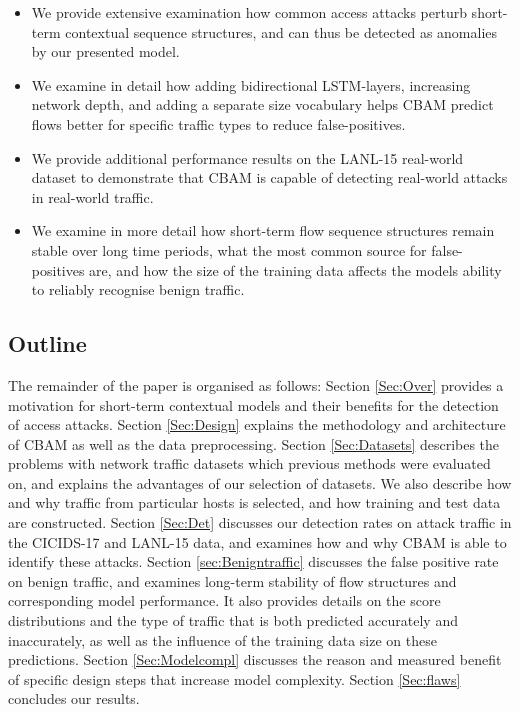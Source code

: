 \begin{itemize}
\item We provide extensive examination how common access attacks perturb short-term contextual sequence structures, and can thus be detected as anomalies by our presented model. 
\item We examine in detail how adding bidirectional LSTM-layers, increasing network depth, and adding a separate size vocabulary helps CBAM predict flows better for specific traffic types to reduce false-positives.
\item We provide additional performance results on the LANL-15 real-world dataset to demonstrate that CBAM is capable of detecting real-world attacks in real-world traffic.
\item We examine in more detail how short-term flow sequence structures remain stable over long time periods, what the most common source for false-positives are, and how the size of the training data affects the models ability to reliably recognise benign traffic.
\end{itemize}

\subsection{Outline}

The remainder of the paper is organised as follows:
Section \ref{Sec:Over} provides a motivation for short-term contextual models and their benefits for the detection of access attacks. Section \ref{Sec:Design} explains the methodology and architecture of CBAM  as well as the data preprocessing. Section \ref{Sec:Datasets} describes the problems with network traffic datasets which previous methods were evaluated on, and explains the advantages of our selection of datasets. 
We also describe how and why traffic from particular hosts is selected, and how training and test data are constructed.
Section \ref{Sec:Det} discusses our detection rates on attack traffic in the CICIDS-17 and LANL-15 data, and examines how and why CBAM is able to identify these attacks.
Section \ref{sec:Benigntraffic} discusses the false positive rate on benign traffic, and examines long-term stability of flow structures and corresponding model performance. It also provides details on the score distributions and the type of traffic that is both predicted accurately and inaccurately, as well as the influence of the training data size on these predictions.
Section \ref{Sec:Modelcompl} discusses the reason and measured benefit of specific design steps that increase model complexity.
Section \ref{Sec:flaws} concludes our results.%


